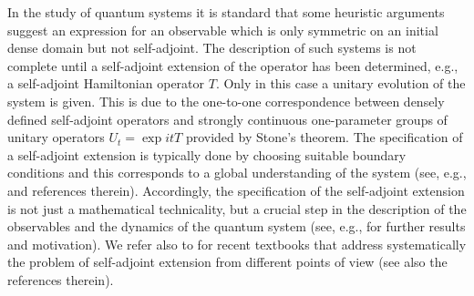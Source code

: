 \documentclass[a4paper,12pt]{amsart}
\newcommand{\1}{\mathbb{I}}
\numberwithin{equation}{section}
\numberwithin{theorem}{section}
\begin{document}
In the study of quantum systems it is standard
that some heuristic arguments suggest an expression for an observable
which is only symmetric on an initial dense domain but not self-adjoint.
The description of such systems is not complete until a self-adjoint extension of the operator has been determined,
e.g., a self-adjoint Hamiltonian operator $T$. Only in this case a unitary evolution of the system is given. This is due to the one-to-one
correspondence between densely defined self-adjoint operators and strongly continuous one-parameter groups of unitary operators
$U_t = \exp it T$ provided by Stone's theorem. 
The specification of a self-adjoint extension is typically done
by choosing suitable boundary conditions and this corresponds to a global understanding of the system
(see, e.g., \cite{ILP13,IbPer2010} and references therein).
Accordingly, the specification of the self-adjoint extension is not just
a mathematical technicality, but a crucial step in the description of the observables and the 
dynamics of the quantum system
(see, e.g., \cite[Chapter~X]{reed75} for further results and motivation).
We refer also to \cite{gitman12,moretti13,schmuedgen12} for recent textbooks that address systematically the problem of
self-adjoint extension from different points of view (see also the references therein).
\end{document}
